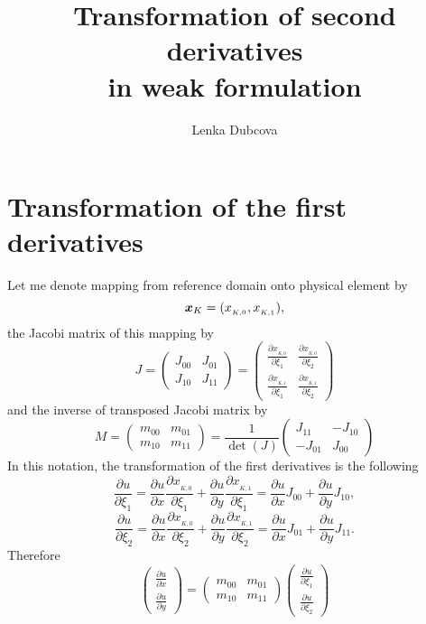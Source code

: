 \documentclass[a4paper,12pt]{article}
\title{Transformation of second derivatives\\[2mm] in weak formulation}
\author{Lenka Dubcova}
\newcommand{\bfx}{\mbox{\boldmath $x$}}
\begin{document}
\maketitle

\section{Transformation of the first derivatives}
Let me denote mapping from reference domain onto physical element by $$\bfx_K = (x_{_{K, 0}}, x_{_{K, 1}}),$$ the Jacobi matrix of this mapping by
$$J =
\left(\begin{array}{cc}
J_{00} & J_{01} \\[3mm]
J_{10} & J_{11}
\end{array}\right) =
\left(\begin{array}{cc}
\frac{\partial x_{_{K,0}}}{\partial \xi_1} & \frac{\partial x_{_{K,0}}}{\partial \xi_2} \\[3mm]
\frac{\partial x_{_{K,1}}}{\partial \xi_1} & \frac{\partial x_{_{K,1}}}{\partial \xi_2} \end{array}\right)
$$
and the inverse of transposed Jacobi matrix by
$$M =
\left(\begin{array}{cc}
m_{00} & m_{01} \\
m_{10} & m_{11}
\end{array}\right) = \frac{1}{\det(J)}
\left(\begin{array}{cc}
J_{11} & -J_{10} \\
-J_{01} & J_{00}
\end{array}\right)
$$
In this notation, the transformation of the first derivatives is the following
$$\frac{\partial u}{\partial \xi_1} = \frac{\partial u}{\partial x} \frac{\partial x_{_{K,0}}}{\partial \xi_1} + \frac{\partial u}{\partial y} \frac{\partial x_{_{K,1}}}{\partial \xi_1} = \frac{\partial u}{\partial x} J_{00} + \frac{\partial u}{\partial y} J_{10},$$
$$\frac{\partial u}{\partial \xi_2} = \frac{\partial u}{\partial x} \frac{\partial x_{_{K,0}}}{\partial \xi_2} + \frac{\partial u}{\partial y} \frac{\partial x_{_{K,1}}}{\partial \xi_2} = \frac{\partial u}{\partial x} J_{01} + \frac{\partial u}{\partial y} J_{11}.$$
Therefore
$$
\left(\begin{array}{c}
\frac{\partial u}{\partial x} \\[3mm]
\frac{\partial u}{\partial y}
\end{array}\right) =
\left(\begin{array}{cc}
m_{00} & m_{01} \\[3mm]
m_{10} & m_{11}
\end{array}\right) \left(\begin{array}{c}
\frac{\partial u}{\partial \xi_1} \\[3mm]
\frac{\partial u}{\partial \xi_2}
\end{array}\right)
$$
\end{document}
